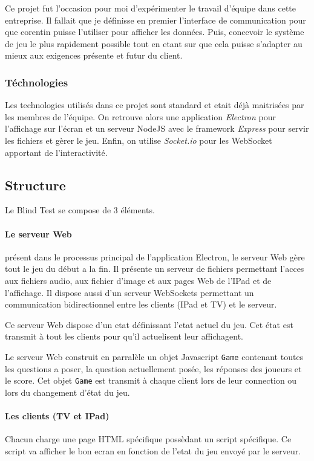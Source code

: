 \documentclass{article}
\begin{document}
Ce projet fut l'occasion pour moi d'expérimenter le travail d'équipe dans cette entreprise.
Il fallait que je définisse en premier l'interface de communication pour que corentin puisse l'utiliser pour afficher les données.
Puis, concevoir le système de jeu le plus rapidement possible tout en etant sur que cela puisse s'adapter au mieux aux exigences présente et futur du client.

\subsubsection{Téchnologies}

Les technologies utilisés dans ce projet sont standard et etait déjà maitrisées par les membres de l'équipe.
On retrouve alors une application \emph{Electron} pour l'affichage sur l'écran et un serveur NodeJS avec le framework \emph{Express} pour servir les fichiers et gèrer le jeu.
Enfin, on utilise \emph{Socket.io} pour les WebSocket apportant de l'interactivité.

\subsection{Structure}

Le Blind Test se compose de 3 éléments.

\paragraph{Le serveur Web} présent dans le processus principal de l'application Electron, le serveur Web gère tout le jeu du début a la fin.
Il présente un serveur de fichiers permettant l'acces aux fichiers audio, aux fichier d'image et aux pages Web de l'IPad et de l'affichage.
Il dispose aussi d'un serveur WebSockets permettant un communication bidirectionnel entre les clients (IPad et TV) et le serveur.

Ce serveur Web dispose d'un etat définissant l'etat actuel du jeu.
Cet état est transmit à tout les clients pour qu'il actuelisent leur affichagent.

Le serveur Web construit en parralèle un objet Javascript \texttt{Game} contenant toutes les questions a poser, la question actuellement posée, les réponses des joueurs et le score.
Cet objet \texttt{Game} est transmit à chaque client lors de leur connection ou lors du changement d'état du jeu.

\paragraph{Les clients (TV et IPad)} Chacun charge une page HTML spécifique possèdant un script spécifique.
Ce script va afficher le bon ecran en fonction de l'etat du jeu envoyé par le serveur.
\end{document}
